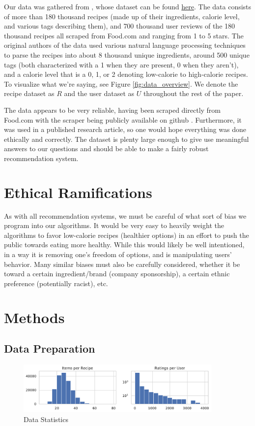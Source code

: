 \documentclass[11pt]{article}
\begin{document}
Our data was gathered from \cite{data}, whose dataset can be found \href{https://www.kaggle.com/shuyangli94/food-com-recipes-and-user-interactions}{here}. The data consists of more than 180 thousand recipes (made up of their ingredients, calorie level, and various tags describing them), and 700 thousand user reviews of the 180 thousand recipes all scraped from Food.com  and ranging from 1 to 5 stars. The original authors of the data used various natural language processing techniques to parse the recipes into about 8 thousand unique ingredients, around 500 unique tags (both characterized with a 1 when they are present, 0 when they aren't), and a calorie level that is a 0, 1, or 2 denoting low-calorie to high-calorie recipes. To visualize what we're saying, see Figure \ref{fig:data_overview}. We denote the recipe dataset as $R$ and the user dataset as $U$ throughout the rest of the paper.

The data appears to be very reliable, having been scraped directly from Food.com with the scraper being publicly available on github \cite{data_scraper}. Furthermore, it was used in a published research article, so one would hope everything was done ethically and correctly. The dataset is plenty large enough to give use meaningful answers to our questions and should be able to make a fairly robust recommendation system.


\section{Ethical Ramifications}
As with all recommendation systems, we must be careful of what sort of bias we program into our algorithms. It would be very easy to heavily weight the algorithms to favor low-calorie recipes (healthier options) in an effort to push the public towards eating more healthy. While this would likely be well intentioned, in a way it is removing one's freedom of options, and is manipulating users' behavior. Many similar biases must also be carefully considered, whether it be toward a certain ingredient/brand (company sponsorship), a certain ethnic preference (potentially racist), etc.

\section{Methods}

\subsection{Data Preparation}
\begin{figure}[t]
\centering
\includegraphics[width=0.9\textwidth]{figs/dist.pdf}
\caption{Data Statistics}
\label{fig:dist}
\end{figure}
\end{document}
